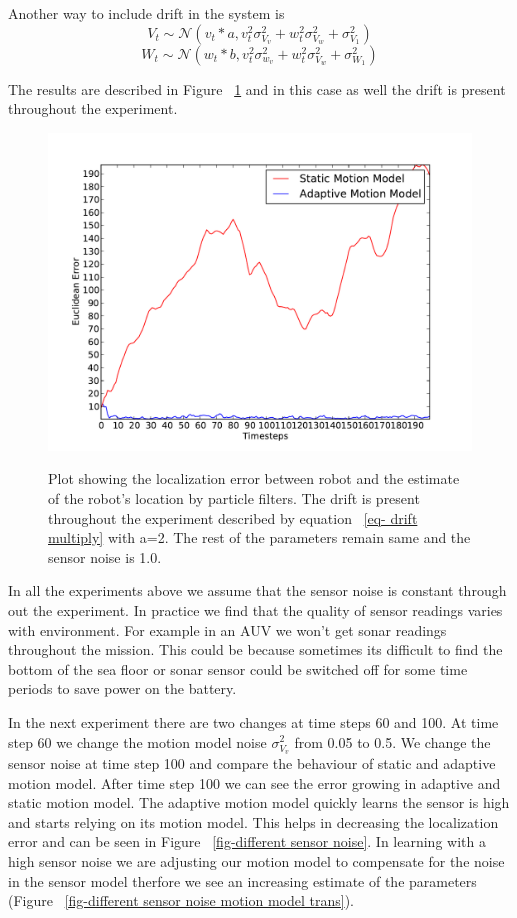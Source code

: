 \documentclass[12pt]{dalcsthesis}
\begin{document}
Another way to include drift in the system is 
\begin{equation}
\label{eq- drift multiply}
V_{t}\sim\mathcal{{N}}(v_{t}*a,v_{t}^{2}\sigma_{V_{v}}^{2}+w_{t}^{2}\sigma_{V_{w}}^{2}+\sigma_{V_{1}}^{2})
\end{equation}
\begin{equation}
W_{t}\sim\mathcal{{N}}(w_{t}*b,v_{t}^{2}\sigma_{w_{v}}^{2}+w_{t}^{2}\sigma_{V_{w}}^{2}+\sigma_{W_{1}}^{2})
\end{equation}


The results are described in Figure ~\ref{fig-drift_multiply} and in this case as well the drift is present throughout the experiment.
\begin{figure}
  \centering
     {\includegraphics[height = 3.0 in]{./plots/200_005_005_s_10_traj_3_drift_20_multiply.pdf}}
  \caption{\label{fig-drift_multiply} Plot showing the localization error between robot and the estimate of the robot's location by particle filters. The drift is present throughout the experiment described by equation ~\ref{eq- drift multiply} with a=2. The rest of the parameters remain same and the sensor noise is 1.0. }
\end{figure}

In all the experiments above we assume that the sensor noise is constant through out the experiment. In practice we find that the quality of sensor readings varies with environment. For example in an AUV we won't get sonar readings throughout the mission. This could be because sometimes its difficult to find the bottom of the sea floor or sonar sensor could be switched off for some time periods to save power on the battery.

In the next experiment there are two changes at time steps 60 and 100. At time step 60 we change the motion model noise $\sigma_{V_{v}}^2$ from 0.05 to 0.5. We change the sensor noise  at time step 100 and compare the behaviour of static and adaptive motion model. After time step 100 we can see the error growing in adaptive and static motion model. The adaptive motion model quickly learns the sensor is high and starts relying on its motion model. This helps in decreasing the localization error and can be seen in Figure ~\ref{fig-different sensor noise}. In learning with a high sensor noise we are adjusting our motion model to compensate for the noise in the sensor model therfore we see an increasing estimate of the parameters (Figure ~\ref{fig-different sensor noise motion model trans}).
\end{document}
